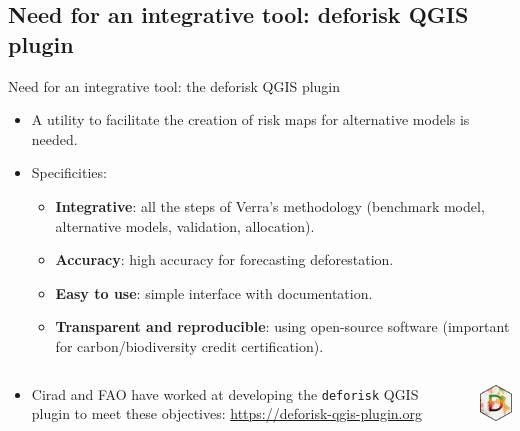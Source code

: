 \documentclass[10pt,table,dvipsnames,compress]{beamer}
\begin{document}
\subsection{Need for an integrative tool: deforisk QGIS plugin}
\label{need-for-an-integrative-tool-deforisk-qgis-plugin-1}
\begin{frame}[label=need-for-an-integrative-tool-the-deforisk-qgis-plugin-2,fragile]{Need for an integrative tool: the deforisk QGIS plugin}
 \begin{itemize}
\item A utility to facilitate the creation of risk maps for alternative models is needed.
\item Specificities:
\begin{itemize}
\item \textbf{Integrative}: all the steps of Verra's methodology (benchmark model, alternative models, validation, allocation).
\item \textbf{Accuracy}: high accuracy for forecasting deforestation.
\item \textbf{Easy to use}: simple interface with documentation.
\item \textbf{Transparent and reproducible}: using open-source software (important for carbon/biodiversity credit certification).
\end{itemize}
\end{itemize}

\begin{columns}
\begin{column}{0.8\columnwidth}
\begin{itemize}
\item Cirad and FAO have worked at developing the \texttt{deforisk} QGIS plugin to meet these objectives: \url{https://deforisk-qgis-plugin.org}
\end{itemize}
\end{column}

\begin{column}{0.2\columnwidth}
\includegraphics[width=1.5cm]{figs/logo-deforisk.png}
\end{column}
\end{columns}
\end{frame}

\end{document}
